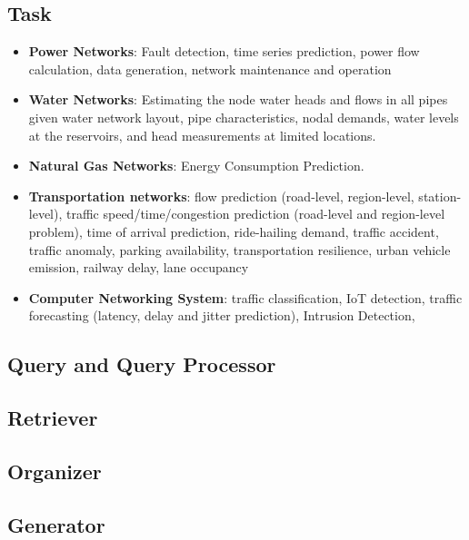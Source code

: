 \subsection{Task}
\begin{itemize}
    \item \textbf{Power Networks}: Fault detection, time series prediction, power flow calculation, data generation, network maintenance and operation 

    \item \textbf{Water Networks}: Estimating the node water heads and flows in all pipes given water network layout, pipe characteristics, nodal demands, water levels at the reservoirs, and head measurements at limited locations.

    \item \textbf{Natural Gas Networks}: Energy Consumption Prediction.

    \item \textbf{Transportation networks}: flow prediction (road-level, region-level, station-level), traffic speed/time/congestion prediction (road-level and region-level problem), time of arrival prediction, ride-hailing demand, traffic accident, traffic anomaly, parking availability, transportation resilience, urban vehicle emission, railway delay, lane occupancy

    \item \textbf{Computer Networking System}: traffic classification, IoT detection, traffic forecasting (latency, delay and jitter prediction), Intrusion Detection, 
\end{itemize}

\subsection{Query and Query Processor}

\subsection{Retriever}

\subsection{Organizer}

\subsection{Generator}

